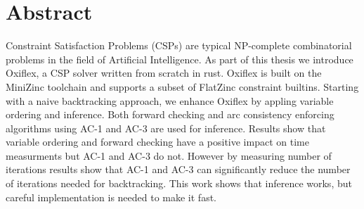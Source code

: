 
\chapter*{Abstract}

Constraint Satisfaction Problems (CSPs) are typical NP-complete combinatorial problems in the field of Artificial Intelligence. As part of this thesis we introduce Oxiflex, a CSP solver written from scratch in rust. Oxiflex is built on the MiniZinc toolchain and supports a subset of FlatZinc constraint builtins. Starting with a naive backtracking approach, we enhance Oxiflex by appling variable ordering and inference. Both forward checking and arc consistency enforcing algorithms using AC-1 and AC-3 are used for inference. Results show that variable ordering and forward checking have a positive impact on time measurments but AC-1 and AC-3 do not. However by measuring number of iterations results show that AC-1 and AC-3 can significantly reduce the number of iterations needed for backtracking. This work shows that inference works, but careful implementation is needed to make it fast.

